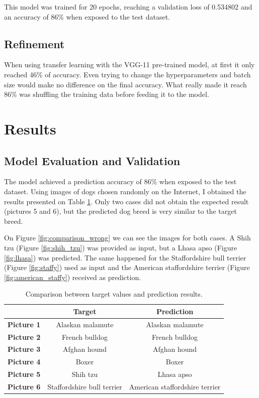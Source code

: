 \documentclass{article}
\begin{document}
    This model was trained for 20 epochs, reaching a validation loss of 0.534802 and an accuracy of 86\% when exposed to the test dataset.

    \subsection{Refinement}

    When using transfer learning with the VGG-11 pre-trained model, at first it only reached 46\% of accuracy. Even trying to change the hyperparameters and batch size would make no difference on the final accuracy. What really made it reach 86\% was shuffling the training data before feeding it to the model.

    \section{Results}

    \subsection{Model Evaluation and Validation}

    The model achieved a prediction accuracy of 86\% when exposed to the test dataset. Using images of dogs chosen randomly on the Internet, I obtained the results presented on Table \ref{tab:target_pred}. Only two cases did not obtain the expected result (pictures 5 and 6), but the predicted dog breed is very similar to the target breed.
    
    On Figure \ref{fig:comparison_wrong} we can see the images for both cases. A Shih tzu (Figure \ref{fig:shih_tzu}) was provided as input, but a Lhasa apso (Figure \ref{fig:lhasa}) was predicted. The same happened for the Staffordshire bull terrier (Figure \ref{fig:staffy}) used as input and the American staffordshire terrier (Figure \ref{fig:american_staffy}) received as prediction.
    
    \begin{table}[htbp]
        \centering
        \begin{tabular}{c|c|c}
             & \textbf{Target} & \textbf{Prediction} \\
            \hline
            \textbf{Picture 1} & Alaskan malamute & Alaskan malamute \\
            \textbf{Picture 2} & French bulldog & French bulldog \\
            \textbf{Picture 3} & Afghan hound & Afghan hound \\
            \textbf{Picture 4} & Boxer & Boxer \\
            \textbf{Picture 5} & Shih tzu & Lhasa apso \\
            \textbf{Picture 6} & Staffordshire bull terrier & American staffordshire terrier \\
        \end{tabular}
        \caption{Comparison between target values and prediction results.}
        \label{tab:target_pred}
    \end{table}
\end{document}
